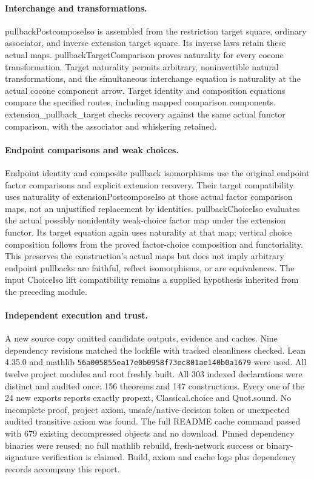 \documentclass{article}
\begin{document}
\paragraph{Interchange and transformations.} pullbackPostcomposeIso is assembled from the restriction target square, ordinary associator, and inverse extension target square. Its inverse laws retain these actual maps. pullbackTargetComparison proves naturality for every cocone transformation. Target naturality permits arbitrary, noninvertible natural transformations, and the simultaneous interchange equation is naturality at the actual cocone component arrow. Target identity and composition equations compare the specified routes, including mapped comparison components. extension\_pullback\_target checks recovery against the same actual functor comparison, with the associator and whiskering retained.
\paragraph{Endpoint comparisons and weak choices.} Endpoint identity and composite pullback isomorphisms use the original endpoint factor comparisons and explicit extension recovery. Their target compatibility uses naturality of extensionPostcomposeIso at those actual factor comparison maps, not an unjustified replacement by identities. pullbackChoiceIso evaluates the actual possibly nonidentity weak-choice factor map under the extension functor. Its target equation again uses naturality at that map; vertical choice composition follows from the proved factor-choice composition and functoriality. This preserves the construction's actual maps but does not imply arbitrary endpoint pullbacks are faithful, reflect isomorphisms, or are equivalences. The input ChoiceIso lift compatibility remains a supplied hypothesis inherited from the preceding module.
\paragraph{Independent execution and trust.} A new source copy omitted candidate outputs, evidence and caches. Nine dependency revisions matched the lockfile with tracked cleanliness checked. Lean 4.35.0 and mathlib \texttt{56a005855ea17e0b0958f73ec801ae140b0a1679} were used. All twelve project modules and root freshly built. All 303 indexed declarations were distinct and audited once: 156 theorems and 147 constructions. Every one of the 24 new exports reports exactly propext, Classical.choice and Quot.sound. No incomplete proof, project axiom, unsafe/native-decision token or unexpected audited transitive axiom was found. The full README cache command passed with 679 existing decompressed objects and no download. Pinned dependency binaries were reused; no full mathlib rebuild, fresh-network success or binary-signature verification is claimed. Build, axiom and cache logs plus dependency records accompany this report.
\end{document}

